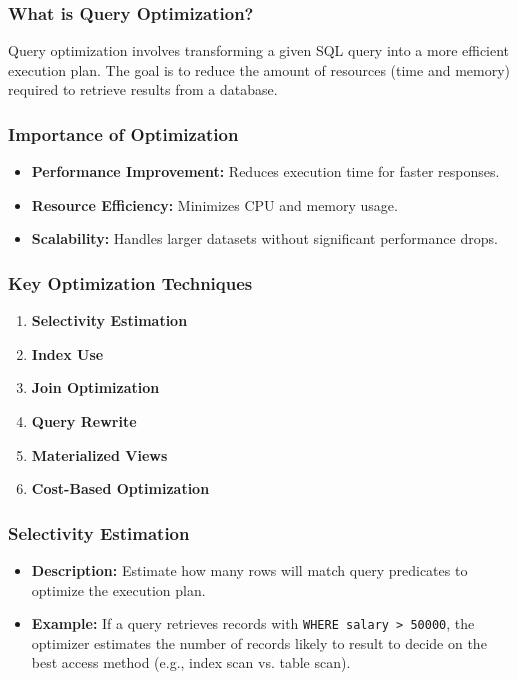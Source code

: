 \documentclass[aspectratio=169]{beamer}
\begin{document}
\begin{frame}[fragile]
    \frametitle{What is Query Optimization?}
    Query optimization involves transforming a given SQL query into a more efficient execution plan. The goal is to reduce the amount of resources (time and memory) required to retrieve results from a database.
\end{frame}

\begin{frame}[fragile]
    \frametitle{Importance of Optimization}
    \begin{itemize}
        \item \textbf{Performance Improvement:} Reduces execution time for faster responses.
        \item \textbf{Resource Efficiency:} Minimizes CPU and memory usage.
        \item \textbf{Scalability:} Handles larger datasets without significant performance drops.
    \end{itemize}
\end{frame}

\begin{frame}[fragile]
    \frametitle{Key Optimization Techniques}
    \begin{enumerate}
        \item \textbf{Selectivity Estimation}
        \item \textbf{Index Use}
        \item \textbf{Join Optimization}
        \item \textbf{Query Rewrite}
        \item \textbf{Materialized Views}
        \item \textbf{Cost-Based Optimization}
    \end{enumerate}
\end{frame}

\begin{frame}[fragile]
    \frametitle{Selectivity Estimation}
    \begin{itemize}
        \item \textbf{Description:} Estimate how many rows will match query predicates to optimize the execution plan.
        \item \textbf{Example:} If a query retrieves records with \texttt{WHERE salary > 50000}, the optimizer estimates the number of records likely to result to decide on the best access method (e.g., index scan vs. table scan).
    \end{itemize}
\end{frame}
\end{document}
